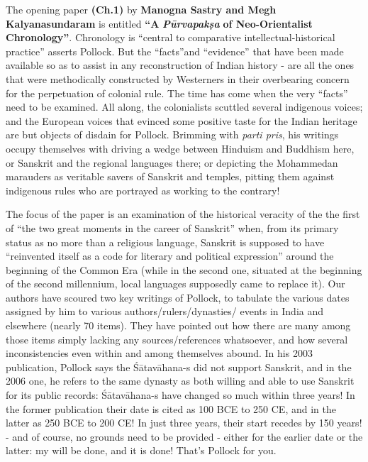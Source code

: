 The opening paper \textbf{(Ch.1)} by \textbf{Manogna Sastry and Megh Kalyanasundaram} is entitled \textbf{“A} \textit{\textbf{Pūrvapakṣa}}\textbf{ of Neo-Orientalist Chronology”}. Chronology is “central to comparative intellectual-historical practice” asserts Pollock. But the “facts”and “evidence” that have been made available so as to assist in any reconstruction of Indian history - are all the ones that were methodically constructed by Westerners in their overbearing concern for the perpetuation of colonial rule. The time has come when the very “facts” need to be examined. All along, the colonialists scuttled several indigenous voices; and the European voices that evinced some positive taste for the Indian heritage are but objects of disdain for Pollock. Brimming with\textit{ parti pris}, his writings occupy themselves with driving a wedge between Hinduism and Buddhism here, or Sanskrit and the regional languages there; or depicting the Mohammedan marauders as veritable savers of Sanskrit and temples, pitting them against indigenous rules who are portrayed as working to the contrary!

The focus of the paper is an examination of the historical veracity of the the first of “the two great moments in the career of Sanskrit” when, from its primary status as no more than a religious language, Sanskrit is supposed to have “reinvented itself as a code for literary and political expression” around the beginning of the Common Era (while in the second one, situated at the beginning of the second millennium, local languages supposedly came to replace it). Our authors have scoured two key writings of Pollock, to tabulate the various dates assigned by him to various authors/rulers/dynasties/ events in India and elsewhere (nearly 70 items). They have pointed out how there are many among those items simply lacking any sources/references whatsoever, and how several inconsistencies even within and among themselves abound. In his 2003 publication, Pollock says the Śātavāhana-s did not support Sanskrit, and in the 2006 one, he refers to the same dynasty as both willing and able to use Sanskrit for its public records: Śātavāhana-s have changed so much within three years! In the former publication their date is cited as 100 BCE to 250 CE, and in the latter as 250 BCE to 200 CE! In just three years, their start recedes by 150 years! - and of course, no grounds need to be provided - either for the earlier date or the latter: my will be done, and it is done! That’s Pollock for you.

